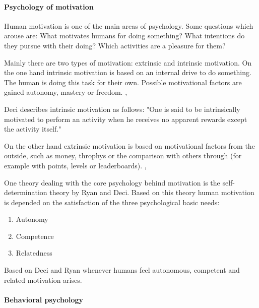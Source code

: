 \paragraph*{Psychology of motivation}
Human motivation is one of the main areas of psychology. Some questions which arouse are: What motivates humans for doing something? What intentions do they pursue with their doing? Which activities are a pleasure for them? \cite[p. 1]{bierhoffeditorEnzyklopaediePsychologieSoziale2016}

Mainly there are two types of motivation: extrinsic and intrinsic motivation. 
On the one hand intrinsic motivation is based on an internal drive to do something. The human is doing this task for their own. Possible motivational factors are gained autonomy, mastery or freedom. \cite[p. 2, 3, 4]{bierhoffeditorEnzyklopaediePsychologieSoziale2016}, \cite[p. 60, 61]{inproceedings}

Deci describes intrinsic motivation as follows: "One is said to be intrinsically motivated to perform an activity when he receives no apparent rewards except the activity itself." \cite[p. 105]{deciEffectsExternallyMediated1971}

On the other hand extrinsic motivation is based on motivational factors from the outside, such as money, throphys or the comparison with others through (for example with points, levels or leaderboards). \cite[p. 2, 3, 4]{bierhoffeditorEnzyklopaediePsychologieSoziale2016}, \cite[p. 60, 61]{inproceedings}

\label{selfDeterminationTheory}
One theory dealing with the core psychology behind motivation is the self-determination theory by Ryan and Deci. Based on this theory human motivation is depended on the satisfaction of the three psychological basic needs: 
\begin{enumerate}
	\item Autonomy
	\item Competence
	\item Relatedness
\end{enumerate} 
Based on Deci and Ryan whenever humans feel autonomous, competent and related motivation arises. \cite[p. 416-432]{deciTheoriesSocialPsychology2019}


\paragraph*{Behavioral psychology}

